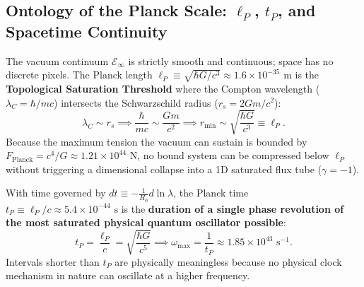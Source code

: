 \subsection{Ontology of the Planck Scale: $\ell_P$, $t_P$, and Spacetime Continuity}
\label{sec:planck_ontolojisi_main}

\begin{theorem}
    \label{thm:planck_uzunlugu_doyum_main}
    The vacuum continuum $\mathcal{E}_\infty$ is strictly smooth and continuous; space has no discrete pixels. The Planck length $\ell_P \equiv \sqrt{\hbar G/c^3} \approx 1.6 \times 10^{-35}\text{ m}$ is the \textbf{Topological Saturation Threshold} where the Compton wavelength ($\lambda_C = \hbar/mc$) intersects the Schwarzschild radius ($r_s = 2Gm/c^2$):
    \begin{equation}
        \lambda_C \sim r_s \implies \frac{\hbar}{mc} \sim \frac{Gm}{c^2} \implies r_{\mathrm{min}} \sim \sqrt{\frac{\hbar G}{c^3}} \equiv \ell_P.
        \label{eq:planck_uzunluk_turetilis_main}
    \end{equation}
    Because the maximum tension the vacuum can sustain is bounded by $F_{\mathrm{Planck}} = c^4/G \approx 1.21 \times 10^{44}\text{ N}$, no bound system can be compressed below $\ell_P$ without triggering a dimensional collapse into a 1D saturated flux tube ($\gamma = -1$).
\end{theorem}

\begin{theorem}
    \label{thm:planck_zamani_frekans_main}
    With time governed by $dt \equiv -\frac{1}{H_0} d\ln\lambda$, the Planck time $t_P \equiv \ell_P/c \approx 5.4 \times 10^{-44}\text{ s}$ is the \textbf{duration of a single phase revolution of the most saturated physical quantum oscillator possible}:
    \begin{equation}
        t_P = \frac{\ell_P}{c} = \sqrt{\frac{\hbar G}{c^5}} \implies \omega_{\mathrm{max}} = \frac{1}{t_P} \approx 1.85 \times 10^{43}\text{ s}^{-1}.
        \label{eq:planck_zamani_turetilis_main}
    \end{equation}
    Intervals shorter than $t_P$ are physically meaningless because no physical clock mechanism in nature can oscillate at a higher frequency.
\end{theorem}

